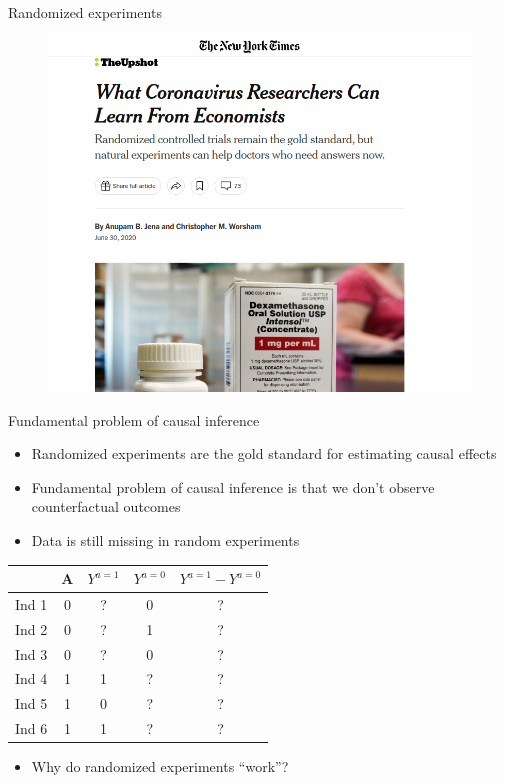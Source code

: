 \documentclass{beamer}
\begin{document}
\begin{frame}{Randomized experiments}
\begin{figure}
    \centering
    \includegraphics[scale = .3]{figures/goldStandard.png}
\end{figure}
    
\end{frame}

\begin{frame}{Fundamental problem of causal inference}
\begin{itemize}
     \item Randomized experiments are the gold standard for estimating causal effects
    \item Fundamental problem of causal inference is that we don't observe counterfactual outcomes
    \item Data is still missing in random experiments
\end{itemize}

\begin{table}\footnotesize
    \centering

\begin{tabular}[t]{c|c| c|c|c}
\toprule
  & A & $Y^{a=1}$ & $Y^{a=0}$ & $Y^{a=1} - Y^{a=0}$\\
\midrule
Ind 1 & 0 & ? & 0 & ?\\
Ind 2 & 0 & ? & 1 & ?\\
Ind 3 & 0  & ? & 0 & ?\\
Ind 4 &1 & 1 & ? & ?\\
Ind 5 & 1 & 0 & ? & ?\\
Ind 6 & 1 & 1 & ? & ?\\
\bottomrule
\end{tabular}
\end{table}

\pause 
\begin{itemize}
    \item Why do randomized experiments ``work''?
\end{itemize}
    
\end{frame}
\end{document}
